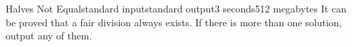 \begin{problem}{Halves Not Equal}{standard input}{standard output}{3 seconds}{512 megabytes}
It can be proved that a fair division always exists. If there is more than one solution, output any of them.

\Examples

\begin{example}
%
%
%
\end{example}

\end{problem}

